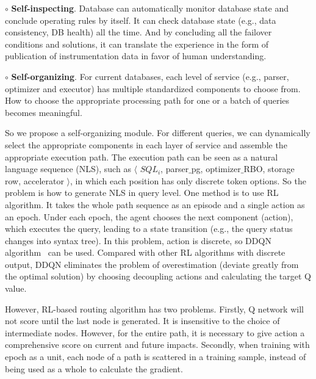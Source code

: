 $\circ$ \textbf{Self-inspecting}. Database can automatically monitor database state and conclude operating rules by itself. It can check database state (e.g., data consistency, DB health) all the time. And by concluding all the failover conditions and solutions, it can translate the experience in the form of publication of instrumentation data in favor of human understanding.


$\circ$ \textbf{Self-organizing}. For current databases, each level of service (e.g., parser, optimizer and executor) has multiple standardized components to choose from. How to choose the appropriate processing path for one or a batch of queries becomes meaningful. 

So we propose a self-organizing module. For different queries, we can dynamically select the appropriate components in each layer of service and assemble the appropriate execution path.
The execution path can be seen as a natural language sequence (NLS), such as $\langle$ $SQL_i$, parser$\_$pg, optimizer$\_$RBO, storage row, accelerator $\rangle$, in which each position has only discrete token options. So the problem is how to generate NLS in query level. One method is to use RL algorithm. It takes the whole path sequence as an episode and a single action as an epoch. Under each epoch, the agent chooses the next component (action), which executes the query, leading to a state transition (e.g., the query status changes into syntax tree). In this problem, action is discrete, so DDQN algorithm~\cite{DBLP:conf/aaai/HasseltGS16} can be used. Compared with other RL algorithms with discrete output, DDQN eliminates the problem of overestimation (deviate greatly from the optimal solution) by choosing decoupling actions and calculating the target Q value.

However, RL-based routing algorithm has two problems. 
Firstly, Q network will not score until the last node is generated. It is insensitive to the choice of intermediate nodes. However, for the entire path, it is necessary to give action a comprehensive score on current and future impacts. 
Secondly, when training with epoch as a unit, each node of a path is scattered in a training sample, instead of being used as a whole to calculate the gradient. 

